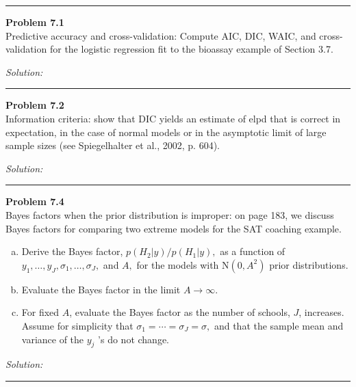 \documentclass[a4paper, 11pt]{article}
\newenvironment{problem}[2][Problem]
    { \begin{mdframed}[backgroundcolor=gray!20] \textbf{#1 #2} \\}
    {  \end{mdframed}}
\newenvironment{solution}
    {\textit{Solution:}}
    {}
\begin{document}
\noindent\rule{7in}{2.8pt}
\begin{problem}{7.1}
    Predictive accuracy and cross-validation: Compute AIC, DIC, WAIC, and cross-validation for the logistic regression fit to the bioassay example of Section 3.7.
\end{problem}
\begin{solution}
  
\end{solution}

\noindent\rule{7in}{2.8pt}
\begin{problem}{7.2}
    Information criteria: show that DIC yields an estimate of elpd that is correct in expectation, in the case of normal models or in the asymptotic limit of large sample sizes (see Spiegelhalter et al., 2002, p. 604).
\end{problem}
\begin{solution}
  
\end{solution}

\noindent\rule{7in}{2.8pt}
\begin{problem}{7.4}
    Bayes factors when the prior distribution is improper: on page 183, we discuss Bayes factors for comparing two extreme models for the SAT coaching example.
    \begin{enumerate}[(a)]
        \item Derive the Bayes factor, $p\left(H_{2} | y\right) / p\left(H_{1} | y\right),$ as a function of $y_{1}, \ldots, y_{J}, \sigma_{1}, \ldots, \sigma_{J},$ and
        $A,$ for the models with $\mathrm{N}\left(0, A^{2}\right)$ prior distributions.
        \item Evaluate the Bayes factor in the limit $A \rightarrow \infty$.
        \item For fixed $A$, evaluate the Bayes factor as the number of schools, $J$, increases. Assume for simplicity that $\sigma_{1}=\cdots=\sigma_{J}=\sigma,$ and that the sample mean and variance of the
        $y_{j}$ 's do not change.
    \end{enumerate}
\end{problem}
\begin{solution}

\end{solution}

\noindent\rule{7in}{2.8pt}
\end{document}

